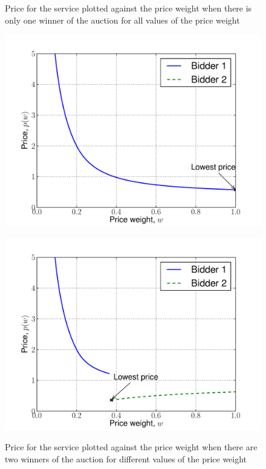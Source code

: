\begin{figure}[tp!]
  \caption{Price for the service plotted against the price weight when there is only one winner of the auction for all values of the price weight}
  \includegraphics[width=\figsize]{2/Figures/indirect_win_prices_15_25_25_75}
  \label{fig:indirect_win_prices_15_25_25_75}
  \caption{Price for the service plotted against the price weight when there are two winners of the auction for different values of the price weight}
  \includegraphics[width=\figsize]{2/Figures/indirect_win_prices_75_25_25_75}
  \label{fig:indirect_win_prices_75_25_25_75}
\end{figure}

